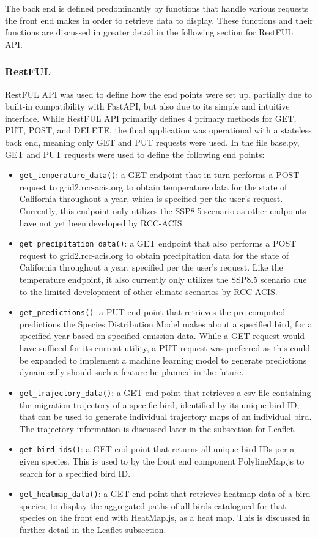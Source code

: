 \documentclass{article}
\begin{document}
The back end is defined predominantly by functions that handle various requests the front end makes in order to retrieve data to display. These functions and their functions are discussed in greater detail in the following section for RestFUL API.

\subsubsection{RestFUL}
RestFUL API was used to define how the end points were set up, partially due to built-in compatibility with FastAPI, but also due to its simple and intuitive interface. While RestFUL API primarily defines 4 primary methods for GET, PUT, POST, and DELETE, the final application was operational with a stateless back end, meaning only GET and PUT requests were used.
In the file base.py, GET and PUT requests were used to define the following end points:

\begin{itemize}
	\item \texttt{get\_temperature\_data()}: a GET endpoint that in turn performs a POST request to grid2.rcc-acis.org to obtain temperature data for the state of California throughout a year, which is specified per the user's request. Currently, this endpoint only utilizes the SSP8.5 scenario as other endpoints have not yet been developed by RCC-ACIS.
   	 \item \texttt{get\_precipitation\_data()}: a GET endpoint that also performs a POST request to grid2.rcc-acis.org to obtain precipitation data for the state of California throughout a year, specified per the user's request. Like the temperature endpoint, it also currently only utilizes the SSP8.5 scenario due to the limited development of other climate scenarios by RCC-ACIS.
	\item \texttt{get\_predictions()}: a PUT end point that retrieves the pre-computed predictions the Species Distribution Model makes about a specified bird, for a specified year based on specified emission data. While a GET request would have sufficed for its current utility, a PUT request was preferred as this could be expanded to implement a machine learning model to generate predictions dynamically should such a feature be planned in the future.
	\item \texttt{get\_trajectory\_data()}: a GET end point that retrieves a csv file containing the migration trajectory of a specific bird, identified by its unique bird ID, that can be used to generate individual trajectory maps of an individual bird. The trajectory information is discussed later in the subsection for Leaflet.
	\item \texttt{get\_bird\_ids()}: a GET end point that returns all unique bird IDs per a given species. This is used to by the front end component PolylineMap.js to search for a specified bird ID.
	\item \texttt{get\_heatmap\_data()}: a GET end point that retrieves heatmap data of a bird species, to display the aggregated paths of all birds catalogued for that species on the front end with HeatMap.js, as a heat map. This is discussed in further detail in the Leaflet subsection.
\end{itemize}
\end{document}
